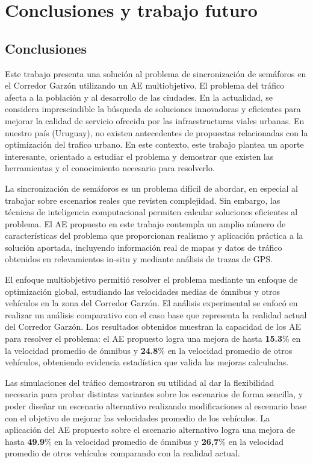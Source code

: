 \chapter{Conclusiones y trabajo futuro}

\section{Conclusiones}
Este trabajo presenta una solución al problema de sincronización de semáforos en el Corredor Garzón utilizando un AE multiobjetivo. El problema del tráfico afecta a la población y al desarrollo de las ciudades. En la actualidad, se considera imprescindible la búsqueda de soluciones innovadoras y eficientes para mejorar la calidad de servicio ofrecida por las infraestructuras viales urbanas. En nuestro país (Uruguay), no existen antecedentes de propuestas relacionadas con la optimización del trafico urbano. En este contexto, este trabajo plantea un aporte interesante, orientado a estudiar el problema y demostrar que existen las herramientas y el conocimiento necesario para resolverlo.

La sincronización de semáforos es un problema difícil de abordar, en especial al trabajar sobre escenarios reales que revisten complejidad. Sin embargo, las técnicas de inteligencia computacional permiten calcular soluciones eficientes al problema. 
El AE propuesto en este trabajo contempla un amplio número de características del problema que proporcionan realismo y aplicación práctica a la solución aportada, incluyendo información real de mapas y datos de tráfico obtenidos en relevamientos in-situ y mediante análisis de trazas de GPS.

El enfoque multiobjetivo permitió resolver el problema mediante un enfoque de optimización global, estudiando las velocidades medias de ómnibus y otros vehículos en la zona del Corredor Garzón. El análisis experimental se enfocó en realizar un análisis comparativo con el caso base que representa la realidad actual del Corredor Garzón. Los resultados obtenidos muestran la capacidad de los AE para resolver el problema: el AE propuesto logra una mejora de hasta \textbf{15.3}\% en la velocidad promedio de ómnibus y \textbf{24.8}\% en la velocidad promedio de otros vehículos, obteniendo evidencia estadística que valida las mejoras calculadas. 

Las simulaciones del tráfico demostraron su utilidad al dar la flexibilidad necesaria para probar distintas variantes sobre los escenarios de forma sencilla, y poder diseñar un escenario alternativo realizando modificaciones al escenario base con el objetivo de mejorar las velocidades promedio de los vehículos. La aplicación del AE propuesto sobre el escenario alternativo logra una mejora de hasta \textbf{49.9}\% en la velocidad promedio de ómnibus y \textbf{26,7}\% en la velocidad promedio de otros vehículos comparando con la realidad actual.

